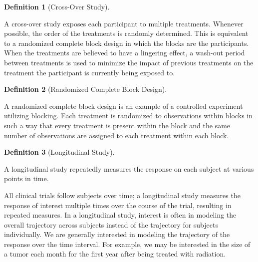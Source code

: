 \documentclass[
  letterpaper,
  DIV=11,
  numbers=noendperiod]{scrreprt}
\theoremstyle{definition}
\newtheorem{definition}{Definition}[chapter]
\theoremstyle{definition}
\theoremstyle{remark}
\begin{document}
\begin{definition}[Cross-Over
Study]\protect\hypertarget{def-cross-over-study}{}\label{def-cross-over-study}

A cross-over study exposes each participant to multiple treatments.
Whenever possible, the order of the treatments is randomly determined.
This is equivalent to a randomized complete block design in which the
blocks are the participants. When the treatments are believed to have a
lingering effect, a wash-out period between treatments is used to
minimize the impact of previous treatments on the treatment the
participant is currently being exposed to.

\end{definition}

\begin{definition}[Randomized Complete Block
Design]\protect\hypertarget{def-rcbd}{}\label{def-rcbd}

A randomized complete block design is an example of a controlled
experiment utilizing blocking. Each treatment is randomized to
observations within blocks in such a way that every treatment is present
within the block and the same number of observations are assigned to
each treatment within each block.

\end{definition}

\begin{definition}[Longitudinal
Study]\protect\hypertarget{def-longitudinal-study}{}\label{def-longitudinal-study}

A longitudinal study repeatedly measures the response on each subject at
various points in time.

\end{definition}

All clinical trials follow subjects over time; a longitudinal study
measures the response of interest multiple times over the course of the
trial, resulting in repeated measures. In a longitudinal study, interest
is often in modeling the overall trajectory across subjects instead of
the trajectory for subjects individually. We are generally interested in
modeling the trajectory of the response over the time interval. For
example, we may be interested in the size of a tumor each month for the
first year after being treated with radiation.
\end{document}
